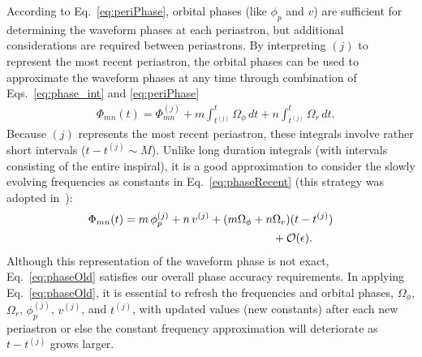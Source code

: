 \documentclass[aps,prd,twocolumn,showpacs,notitlepage,eqsecnum,
superscriptaddress,nofootinbib]{revtex4-1}
\begin{document}
According to Eq.~\eqref{eq:periPhase}, orbital phases (like $\phi_p$ and $v$) are sufficient for determining the waveform phases at each periastron, but additional considerations are required between periastrons. By interpreting $(j)$ to represent the most recent periastron, the orbital phases can be used to approximate the waveform phases at any time through combination of Eqs.~\eqref{eq:phase_int} and \eqref{eq:periPhase}
\begin{align}
\label{eq:phaseRecent}
&\Phi_{mn}(t) = \Phi_{mn}^{(j)} + m \int_{t^{(j)}}^t \Omega_\phi \, dt + n \int_{t^{(j)}}^t \Omega_r \, dt.
\end{align}
Because $(j)$ represents the most recent periastron, these integrals involve rather short intervals ($t-t^{(j)} \sim M$). Unlike long duration integrals (with intervals consisting of the entire inspiral), it is a good approximation to consider the slowly evolving frequencies as constants in Eq.~\eqref{eq:phaseRecent} (this strategy was adopted in~\cite{WarbOsbu17}):
\begin{align}
\Phi_{mn}(t) = m\, \phi^{(j)}_p + n\, v^{(j)} + (m\Omega_\phi + n &\Omega_r)(t-t^{(j)}) \notag
\\& + \mathcal{O}(\epsilon).
\label{eq:phaseOld}
\end{align}
Although this representation of the waveform phase is not exact, Eq.~\eqref{eq:phaseOld} satisfies our overall phase accuracy requirements. In applying Eq.~\eqref{eq:phaseOld}, it is essential to refresh the frequencies and orbital phases, $\Omega_\phi$, $\Omega_r$, $\phi^{(j)}_p$, $v^{(j)}$, and $t^{(j)}$, with updated values (new constants) after each new periastron or else the constant frequency approximation will deteriorate as $t-t^{(j)}$ grows larger.
\end{document}
